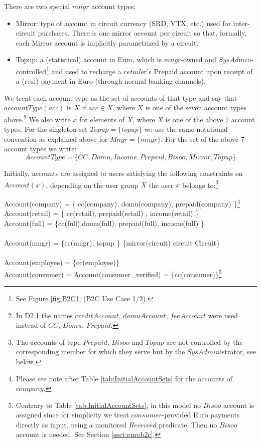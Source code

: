 There are two special $mngr$ account types:
\begin{itemize}
	\item Mirror: type of account in circuit currency (SRD, VTX, etc.) used for inter-circuit purchases. There is one mirror account per circuit so that, formally, each Mirror account is implicitly parametrized by a circuit.	
	\item Topup: a (statistical) account in Euro, which is $mngr$-owned and $SysAdmin$-controlled\footnote{See Figure \ref{fig:B2C1} (B2C Use Case 1/2).}  and used to recharge a $retail$er's Prepaid account upon receipt of a (real) payment in Euro (through normal banking channels).
\end{itemize}

We treat each account type as the set of accounts of that type and say that $accountType(acc)$ is $X$ if $acc \in X$, where $X$ is one of the seven account types above.\footnote{In D2.1 the names $creditAccount$, $domuAccount$, $feeAccount$ were used instead of $CC$, $Domu$, $Prepaid$.} We also write $x$ for elements of $X$, where $X$ is one of the above 7 account types. For the singleton set $Topup=\{topup\}$ we use the same notational convention as explained above for $Mngr=\{mngr\}$. For the set of the above 7 account types we write:
\[AccountType=\{CC,Domu,Income,Prepaid,Bisoo,Mirror,Topup\} \]

Initially, accounts are assigned to users satisfying the following constraints on $Account(x)$, depending on the user group $X$ the user $x$ belongs to:\footnote{The accounts of type $Prepaid$, $Bisoo$ and $Topup$ are not controlled by the corresponding member for which they serve but by the $SysAdmin$istrator, see below.
}

\begin{asm}
Account(company) = \{ cc(company), domu(company), prepaid(company) \}\footnote{Please see note after Table \ref{tab:InitialAccountSets} for the accounts of $company$.} \\
Account(retail) = \{ cc(retail), prepaid(retail) , income(retail) \} \\
Account(full) = \{cc(full),domu(full), prepaid(full), income(full) \} \\ 
\\
 Account(mngr) = \{cc(mngr), topup \} \cup 
    \{mirror(circuit) \mid circuit \in Circuit\} \\
\\
Account(employee) = \{cc(employee)\} \\
Account(consumer) = Account(consumer\_verified)              
              = \{cc(consumer)\}\footnote{Contrary to Table \ref{tab:InitialAccountSets}, in this model no $Bisoo$ account is assigned since for simplicity we treat $consumer$-provided Euro payments directly as input, using a monitored $Received$ predicate. Then no $Bisoo$ account is needed. See Section \ref{sect:eurob2c}.}
\end{asm}

